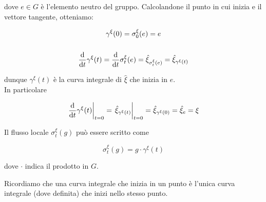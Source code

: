 dove $ e \in G $ è l'elemento neutro del gruppo. Calcolandone il punto in cui inizia e il vettore tangente, otteniamo:

\begin{gather}
	\gamma^{\xi}(0) = \sigma_{0}^{\xi}(e) = e \\
	\nonumber \\
	\dv{t} \gamma^{\xi}(t) = \dv{t} \sigma_{t}^{\xi}(e) %
	= \hat{\xi}_{\sigma_{t}^{\xi}(e)} %
	= \hat{\xi}_{\gamma^{\xi}(t)}
\end{gather}

dunque $ \gamma^{\xi}(t) $ è la curva integrale di $ \hat{\xi} $ che inizia in $ e $.\\
In particolare

\begin{equation}
	\eval{ \dv{t} \gamma^{\xi}(t) }_{t=0} = \eval{ \hat{\xi}_{\gamma^{\xi}(t)} }_{t=0} %
	= \hat{\xi}_{\gamma^{\xi}(0)} %
	= \hat{\xi}_{e} %
	= \xi
\end{equation}

\begin{definition}
	Il flusso locale $ \sigma_{t}^{\xi}(g) $ può essere scritto come
	
	\begin{equation}
		\sigma_{t}^{\xi}(g) = g \cdot \gamma^{\xi}(t)
	\end{equation}

	dove $ \cdot $ indica il prodotto in $ G $.
\end{definition}

Ricordiamo che una curva integrale che inizia in un punto è l'unica curva integrale (dove definita) che inizi nello stesso punto.

